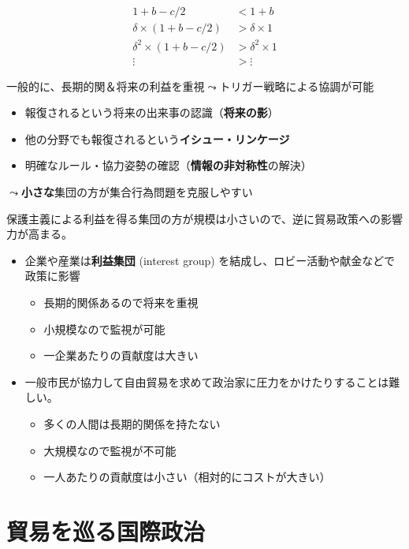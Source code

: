 \documentclass[
  xelatex,
  ja=standard]{bxjsarticle}
\providecommand{\tightlist}{%
  \setlength{\itemsep}{0pt}\setlength{\parskip}{0pt}}\usepackage{longtable,booktabs,array}
\begin{document}
\[
\begin{split}
1+b-c/2 &< 1+b \\
\delta \times (1+b-c/2) &> \delta \times 1 \\
\delta^2 \times (1+b-c/2) &> \delta^2 \times 1 \\
\vdots &> \vdots 
\end{split}
\]

一般的に、長期的関＆将来の利益を重視\(\leadsto\)トリガー戦略による協調が可能

\begin{itemize}
\tightlist
\item
  報復されるという将来の出来事の認識（\textbf{将来の影}）
\item
  他の分野でも報復されるという\textbf{イシュー・リンケージ}
\item
  明確なルール・協力姿勢の確認（\textbf{情報の非対称性}の解決）
\end{itemize}

\(\leadsto\)\textbf{小さな}集団の方が集合行為問題を克服しやすい\citep{olson1996}

保護主義による利益を得る集団の方が規模は小さいので、逆に貿易政策への影響力が高まる。

\begin{itemize}
\tightlist
\item
  企業や産業は\textbf{利益集団} (interest group)
  を結成し、ロビー活動や献金などで政策に影響

  \begin{itemize}
  \tightlist
  \item
    長期的関係あるので将来を重視
  \item
    小規模なので監視が可能
  \item
    一企業あたりの貢献度は大きい
  \end{itemize}
\item
  一般市民が協力して自由貿易を求めて政治家に圧力をかけたりすることは難しい。

  \begin{itemize}
  \tightlist
  \item
    多くの人間は長期的関係を持たない
  \item
    大規模なので監視が不可能
  \item
    一人あたりの貢献度は小さい（相対的にコストが大きい）
  \end{itemize}
\end{itemize}

\hypertarget{ux8cbfux6613ux3092ux5de1ux308bux56fdux969bux653fux6cbb}{%
\section{貿易を巡る国際政治}\label{ux8cbfux6613ux3092ux5de1ux308bux56fdux969bux653fux6cbb}}
\end{document}
